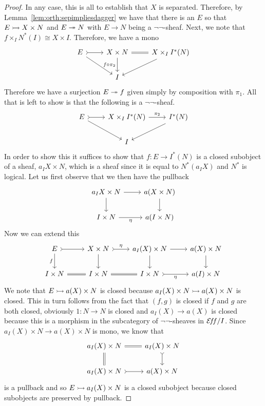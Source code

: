 \begin{proof}
  In any case, this is all to establish that $X$ is
  separated. Therefore, by Lemma~\ref{lem:orth:sepimpliesdagger} we
  have that there is an $E$ so that $E \rightarrowtail X \times N$ and
  $E \twoheadrightarrow N$ with $E \to N$ being a $\neg\neg$-sheaf. Next, we note
  that $f \times_I N^*(I) \cong X \times I$. Therefore, we have a mono
  \[
    \begin{tikzcd}
      E \ar[r, rightarrowtail] \ar[dr] &
      X \times N \ar[d, swap, "f \circ \pi_2"] \ar[r, equals] &
      X \times_I I^*(N) \ar[dl] \\
      &I&
  \end{tikzcd}
  \]
  Therefore we have a surjection $E \twoheadrightarrow f$ given simply by
  composition with $\pi_1$. All that is left to show is that the
  following is a $\neg\neg$-sheaf.
  \[
    \begin{tikzcd}
      E \ar[r, rightarrowtail] \ar[dr] &
      X \times_I I^*(N) \ar[r, "\pi_2"] &
      I^*(N) \ar[dl] \\
      &I&
  \end{tikzcd}
  \]
  In order to show this it suffices to show that $f : E \to I^*(N)$ is
  a closed subobject of a sheaf, $a_I X \times N$, which is a sheaf
  since it is equal to $N^*(a_I X)$ and $N^*$ is logical. Let us first
  observe that we then have the pullback
  \[
    \begin{tikzcd}
      a_I X \times N \ar[r] \ar[d] & a(X \times N) \ar[d] \\
      I \times N \ar[r, swap, "\eta"] & a(I \times N)
    \end{tikzcd}
  \]
  Now we can extend this
  \[
    \begin{tikzcd}
      E \ar[d, swap, "f"] \ar[r, rightarrowtail] &
      X \times N \ar[d] \ar[r, rightarrowtail, "\eta"] &
      a_I(X) \times N \ar[r] \ar[d] &
      a(X) \times N \ar[d] \\
      I \times N \ar[r, equals] &
      I \times N \ar[r, equals] &
      I \times N \ar[r, swap, rightarrowtail, "\eta"] &
      a(I) \times N
    \end{tikzcd}
  \]
  We note that $E \rightarrowtail a(X) \times N$ is closed because
  $a_I(X) \times N \rightarrowtail a(X) \times N$ is closed. This in turn
  follows from the fact that $(f, g)$ is closed if $f$ and $g$ are
  both closed, obviously $1 : N \to N$ is closed and $a_I(X) \to a(X)$
  is closed because this is a morphism in the subcategory of
  $\neg\neg$-sheaves in $\mathcal{E}\!f\!f/I$. Since
  $a_I(X) \times N \to a(X) \times N$ is mono, we know that
  \[
    \begin{tikzcd}
      a_I(X) \times N \ar[r, equals] \ar[d, equals] & a_I(X) \times N \ar[d, rightarrowtail] \\
      a_I(X) \times N \ar[r, rightarrowtail] & a(X) \times N
    \end{tikzcd}
  \]
  is a pullback and so $E \rightarrowtail a_I(X) \times N$ is a closed subobject
  because closed subobjects are preserved by pullback.
\end{proof}
